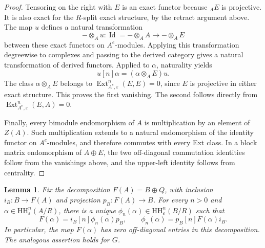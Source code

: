 \documentclass[12pt,a4paper,english,reqno]{amsart}
\numberwithin{equation}{section}
\theoremstyle{plain}
\newtheorem{lemma}[theorem]{Lemma}
\theoremstyle{definition}
\begin{document}
\begin{proof}
Tensoring on the right with $E$ is an exact functor because
${}_AE$ is projective.  It is also exact for the $R$-split exact
structure, by the retract argument above.  The map $u$ defines a
natural transformation
\[
 -\otimes_Au:\operatorname{Id}=-\otimes_AA
                         \longrightarrow -\otimes_AE
\]
between these exact functors on $A^e$-modules.  Applying this
transformation degreewise to complexes and passing to the derived
category gives a natural transformation of derived functors.
Applied to $\alpha$, naturality yields
\[
 u[n]\alpha=(\alpha\otimes_AE)u.
\]
The class $\alpha\otimes_AE$ belongs to
$\operatorname{Ext}_{A^e,\varepsilon}^n(E,E)=0$, since $E$ is
projective in either exact structure.  This proves the first
vanishing.  The second follows directly from
$\operatorname{Ext}_{A^e,\varepsilon}^n(E,A)=0$.

Finally, every bimodule endomorphism of $A$ is multiplication by an
element of $Z(A)$.  Such multiplication extends to a natural
endomorphism of the identity functor on $A^e$-modules, and therefore
commutes with every Ext class.  In a block matrix endomorphism of
$A\oplus E$, the two off-diagonal commutation identities follow from
the vanishings above, and the upper-left identity follows from
centrality.
\end{proof}

\begin{lemma}\label{lem:hh-image-compression}
Fix the decomposition $F(A)=B\oplus Q$, with inclusion
$i_B:B\to F(A)$ and projection $p_B:F(A)\to B$.  For every $n>0$
and $\alpha\in\mathrm{HH}_{\varepsilon}^{n}(A/R)$, there is a
unique $\phi_n(\alpha)\in\mathrm{HH}_{\varepsilon}^{n}(B/R)$
such that
\begin{equation}
 F(\alpha)=i_B[n]\phi_n(\alpha)p_B,
 \qquad
 \phi_n(\alpha)=p_B[n]F(\alpha)i_B.
 \label{eq:hh-image-compression}
\end{equation}
In particular, the map $F(\alpha)$ has zero off-diagonal entries in
this decomposition.  The analogous assertion holds for $G$.
\end{lemma}
\end{document}
